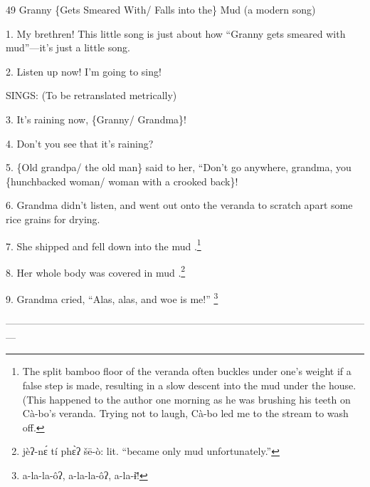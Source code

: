 
49 Granny \{Gets Smeared With/ Falls into the\} Mud (a modern song)

1. My brethren!  This little song is just about how ``Granny gets smeared with
mud''---it's just a little song.

2. Listen up now!  I'm going to sing!

SINGS: (To be retranslated metrically)

3. It's raining now, \{Granny/ Grandma\}!

4. Don't you see that it's raining?

5. \{Old grandpa/ the old man\} said to her, ``Don't go anywhere, grandma, you
\{hunchbacked woman/ woman with a crooked back\}!

6. Grandma didn't listen, and went out onto the veranda to scratch apart some rice
grains for drying.

7. She shipped and fell down into the mud .\footnote{The split bamboo floor of the veranda often buckles under one's weight if a false step is made, resulting in a slow descent into the mud under the house. (This happened to the author one morning as he was brushing his teeth on Cà-bo's veranda.  Trying not to laugh, Cà-bo led me to the stream to wash off.}

8. Her whole body was covered in mud .\footnote{jèʔ-nɛ́ tí phɛ̀ʔ šē-ò: lit. ``became only mud unfortunately.''}

9. Grandma cried, ``Alas, alas, and woe is me!'' \footnote{a-la-la-ôʔ, a-la-la-ôʔ, a-la-ɨ̄!}

---------------------------------------------------------------------------------------------------------------


